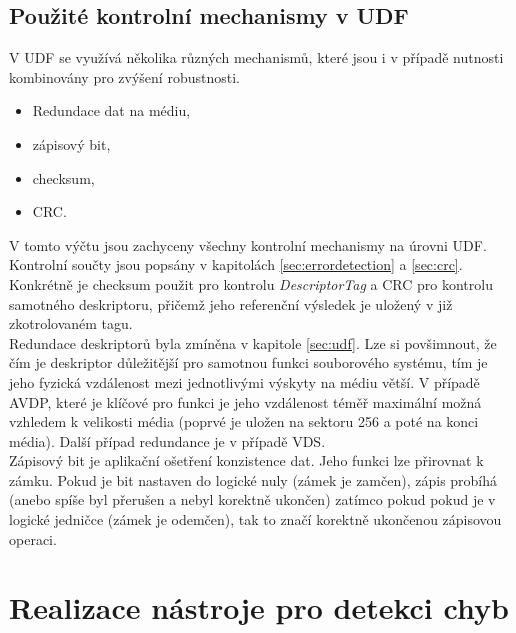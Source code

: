 \section{Použité kontrolní mechanismy v UDF}
\label{sec:howtolabelthat}
V UDF se využívá několika různých mechanismů, které jsou i v případě nutnosti kombinovány pro zvýšení robustnosti.
\begin{itemize}
    \item Redundace dat na médiu,
    \item zápisový bit,
    \item checksum,
    \item CRC.
\end{itemize}
V tomto výčtu jsou zachyceny všechny kontrolní mechanismy na úrovni UDF. Kontrolní součty jsou popsány v kapitolách  \ref{sec:errordetection} a \ref{sec:crc}. Konkrétně je checksum použit pro kontrolu \textit{DescriptorTag} a CRC pro kontrolu samotného deskriptoru, přičemž jeho referenční výsledek je uložený v již zkotrolovaném tagu.\\
Redundace deskriptorů byla zmíněna v kapitole \ref{sec:udf}. Lze si povšimnout, že čím je deskriptor důležitější pro samotnou funkci souborového systému, tím je jeho fyzická vzdálenost mezi jednotlivými výskyty na médiu větší. V případě AVDP, které je klíčové pro funkci je jeho vzdálenost téměř maximální možná vzhledem k velikosti média (poprvé je uložen na sektoru 256 a poté na konci média). Další případ redundance je v případě VDS.\\
Zápisový bit je aplikační ošetření konzistence dat. Jeho funkci lze přirovnat k zámku. Pokud je bit nastaven do logické nuly (zámek je zamčen), zápis probíhá (anebo spíše byl přerušen a nebyl korektně ukončen) zatímco pokud pokud je v logické jedničce (zámek je odemčen), tak to značí korektně ukončenou zápisovou operaci.

\chapter{Realizace nástroje pro detekci chyb}
